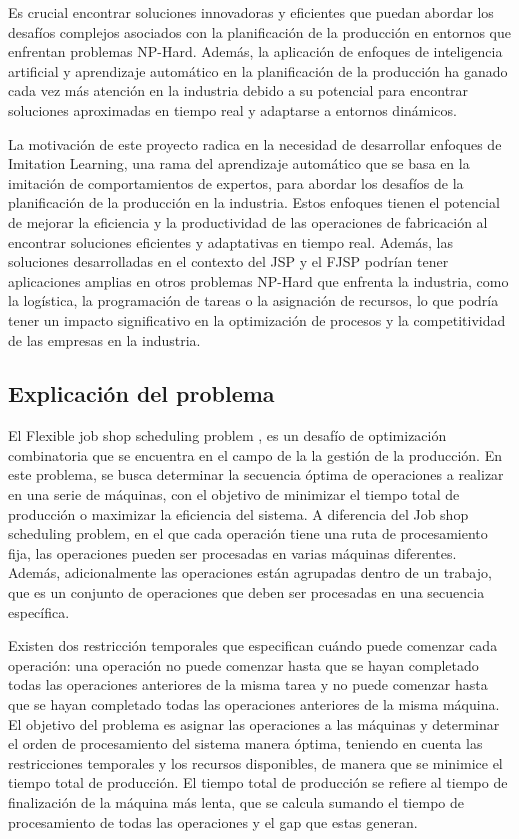 Es crucial encontrar soluciones innovadoras y eficientes que puedan abordar 
los desafíos complejos asociados con la planificación de la producción en entornos que enfrentan 
problemas NP-Hard. Además, la aplicación de enfoques de inteligencia artificial y aprendizaje 
automático en la planificación de la producción ha ganado cada vez más atención en la industria 
debido a su potencial para encontrar soluciones aproximadas en tiempo real y adaptarse a 
entornos dinámicos.\medskip

La motivación de este proyecto radica en la necesidad de desarrollar enfoques de Imitation 
Learning, una rama del aprendizaje automático que se basa en la imitación de comportamientos 
de expertos, para abordar los desafíos de la planificación de la producción en la industria. 
Estos enfoques tienen el potencial de mejorar la eficiencia y la productividad de las operaciones 
de fabricación al encontrar soluciones eficientes y adaptativas en tiempo real. Además, las 
soluciones desarrolladas en el contexto del JSP y el FJSP podrían tener aplicaciones amplias 
en otros problemas NP-Hard que enfrenta la industria, como la logística, la programación de 
tareas o la asignación de recursos, lo que podría tener un impacto significativo en la 
optimización de procesos y la competitividad de las empresas en la industria.

\subsection{Explicación del problema}
El Flexible job shop scheduling problem , es un desafío de optimización combinatoria 
que se encuentra en el campo de la la gestión de la producción. En este problema, se busca determinar 
la secuencia óptima de operaciones a realizar en una serie de máquinas, con el objetivo de minimizar el 
tiempo total de producción o maximizar la eficiencia del sistema. A diferencia del Job shop scheduling 
problem, en el que cada operación tiene una ruta de procesamiento fija, las operaciones pueden ser 
procesadas en varias máquinas diferentes. Además, adicionalmente las operaciones están agrupadas 
dentro de un trabajo, que es un conjunto de operaciones que deben ser procesadas en una secuencia
específica.\medskip

Existen dos restricción temporales que especifican cuándo puede comenzar 
cada operación: una operación no puede comenzar hasta que se hayan completado todas las operaciones
anteriores de la misma tarea y no puede comenzar hasta que se hayan completado todas las operaciones
anteriores de la misma máquina. El objetivo del problema es asignar las operaciones a las máquinas y determinar el orden de procesamiento 
del sistema manera óptima, teniendo en cuenta las restricciones temporales y los recursos disponibles, 
de manera que se minimice el tiempo total de producción. El tiempo total de producción se refiere al
tiempo de finalización de la máquina más lenta, que se calcula sumando el tiempo de procesamiento 
de todas las operaciones y el gap que estas generan.\medskip

